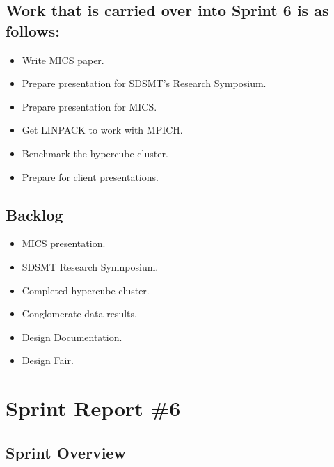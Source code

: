 \subsection*{Work that is carried over into Sprint 6 is as follows:}
\begin{itemize}
	\item Write MICS paper.
	\item Prepare presentation for SDSMT's Research Symposium.
	\item Prepare presentation for MICS.
	\item Get LINPACK to work with MPICH.
	\item Benchmark the hypercube cluster.
	\item Prepare for client presentations.
\end{itemize}

\subsection*{Backlog}
\begin{itemize}
	\item MICS presentation.
	\item SDSMT Research Symnposium.
	\item Completed hypercube cluster.
	\item Conglomerate data results.
	\item Design Documentation.
	\item Design Fair.
\end{itemize}

\section{Sprint Report \#6}

\subsection*{Sprint Overview}
